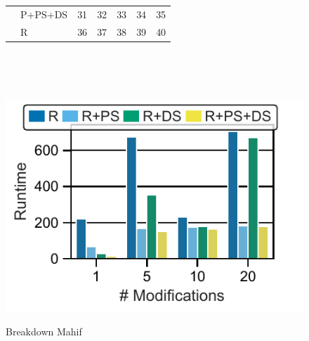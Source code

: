 \begin{figure}[t]
\begin{minipage}[b]{0.34\linewidth}
{\begin{tabular}{|ll|rrrrr|}
               & P+PS+DS                                              & {{31}}                                 & {{32}}                        & {{33}}                                  & {{34}}                     & {{35}}                      \\
               & R                                                    & {{36}}                                & {{37}}                       & {{38}}                                & {{39}}                    & {{40}}                     \\
               \hline
               \end{tabular}
               }                                                                                                                                                                                                                                                                                                               \\[-4mm]
               \caption{Breakdown                                     Mahif}
               \label{fig:Mahif                                       Method}
\end{minipage} \\
               \begin{minipage}[b]{0.245\linewidth}
               \centering
               \includegraphics[width=0.95\linewidth,trim=7 5 0                                     0,                             clip]{imgs/felix_multimod.pdf}           \\
               \vspace{-3mm}

\end{minipage}
\end{figure}
